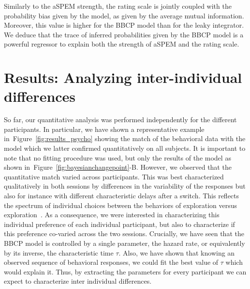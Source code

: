\documentclass[12pt,english]{article}%
\newcommand{\citep}[1]{\parencite{#1}}
\newcommand{\seeFig}[1]{Figure~\ref{fig:#1}}
\newcommand{\AM}[1]{\textbf{\textcolor{blue}{[AM: #1]}}}
\begin{document}
Similarly to the aSPEM strength, the rating scale is jointly coupled
with the probability bias given by the model, as given by the average  mutual information.
Moreover, this value is higher for the BBCP model than 
for the leaky integrator.
We deduce that the trace of inferred probabilities given by the BBCP model
is a powerful regressor to explain both the strength of aSPEM and the rating scale.
\section{Results: Analyzing inter-individual differences}
\label{sec:inter}
So far, our quantitative analysis was performed independently
for the different participants.
In particular, we have shown a representative example in~\seeFig{results_psycho}
showing the match of the behavioral data with the model 
which we latter confirmed quantitatively on all subjects.
It is important to note that no fitting procedure was used,
but only the results of the model as shown in~\seeFig{bayesianchangepoint}-B.
However, we observed that the quantitative match varied across participants.
This was best characterized qualitatively in both sessions by differences
in the variability of the responses but also for instance
with different characteristic delays after a switch.
This reflects the spectrum of individual choices
between the behaviors of exploration versus exploration~\citep{Behrens07}.
As a consequence, we were interested in characterizing this individual preference
of each individual participant, but also to characterize
if this preference co-varied across the two sessions.
Crucially, we have seen that the BBCP model is controlled by a single parameter,
the hazard rate, or equivalently by its inverse, the characteristic time $\tau$.
Also, we have shown that knowing an observed sequence of behavioral responses,
we could fit the best value of $\tau$ which would explain it.
Thus, by extracting the parameters for every participant
we can expect to characterize inter individual differences.
\end{document}
